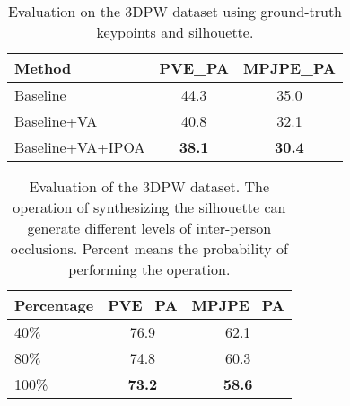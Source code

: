 \documentclass[journal]{IEEEtran}
\begin{document}

\begin{table}[!htbp]
\vspace{-0.2cm}
\caption{ Evaluation on the 3DPW dataset using ground-truth keypoints and silhouette.}
\begin{center}
\begin{tabular}{lcc}
\hline
Method                          & PVE\_PA       & MPJPE\_PA     \\ \hline
Baseline                        & 44.3          & 35.0          \\
Baseline+VA                & 40.8          & 32.1          \\
Baseline+VA+IPOA & \textbf{38.1} & \textbf{30.4} \\ \hline
\end{tabular}
\label{tab:groundtruth}
\end{center}
\end{table}
\vspace{-0.2cm}


\begin{table}[!htbp]
\caption{Evaluation of the 3DPW dataset. The operation of synthesizing the silhouette can generate different levels of inter-person occlusions. Percent means the probability of performing the operation.}
\begin{center}
\begin{tabular}{@{}lcc@{}}
\toprule
Percentage & PVE\_PA & MPJPE\_PA \\ \midrule
40\%       & 76.9    & 62.1      \\
80\%       & 74.8    & 60.3      \\
100\%      & \textbf{73.2}    & \textbf{58.6}      \\ \bottomrule
\end{tabular}
\label{percentage}
\end{center}
\end{table}
\end{document}
